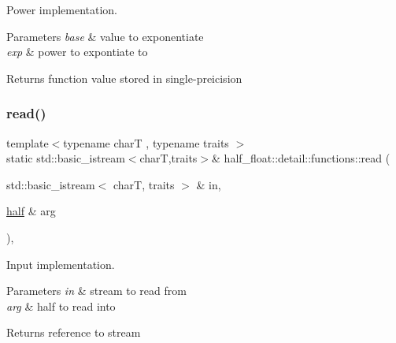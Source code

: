 Power implementation. 
\begin{DoxyParams}{Parameters}
{\em base} & value to exponentiate \\
\hline
{\em exp} & power to expontiate to \\
\hline
\end{DoxyParams}
\begin{DoxyReturn}{Returns}
function value stored in single-\/preicision 
\end{DoxyReturn}
\mbox{\label{structhalf__float_1_1detail_1_1functions_a11c9c85a160dab9b3569d1e051bf6ba5}} 
\subsubsection{\texorpdfstring{read()}{read()}}
{\footnotesize\ttfamily template$<$typename charT , typename traits $>$ \\
static std\+::basic\+\_\+istream$<$charT,traits$>$\& half\+\_\+float\+::detail\+::functions\+::read (\begin{DoxyParamCaption}\item[{std\+::basic\+\_\+istream$<$ charT, traits $>$ \&}]{in,  }\item[{\hyperlink{classhalf__float_1_1half}{half} \&}]{arg }\end{DoxyParamCaption})\hspace{0.3cm}{\ttfamily [inline]}, {\ttfamily [static]}}

Input implementation. 
\begin{DoxyParams}{Parameters}
{\em in} & stream to read from \\
\hline
{\em arg} & half to read into \\
\hline
\end{DoxyParams}
\begin{DoxyReturn}{Returns}
reference to stream 
\end{DoxyReturn}
\mbox{\label{structhalf__float_1_1detail_1_1functions_ae50ef512e0b117a0de654f54f31c6862}} 
